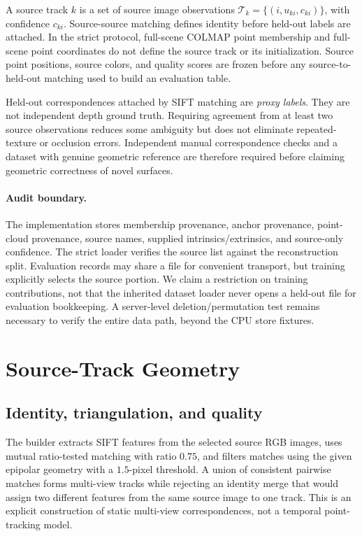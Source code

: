 \documentclass[10pt,twocolumn,letterpaper]{article}
\newcommand{\cT}{\mathcal{T}}
\begin{document}
A source track $k$ is a set of source image observations $\cT_k=\{(i,u_{ki},c_{ki})\}$, with confidence $c_{ki}$. Source-source matching defines identity before held-out labels are attached. In the strict protocol, full-scene COLMAP point membership and full-scene point coordinates do not define the source track or its initialization. Source point positions, source colors, and quality scores are frozen before any source-to-held-out matching used to build an evaluation table.

Held-out correspondences attached by SIFT matching are \emph{proxy labels}. They are not independent depth ground truth. Requiring agreement from at least two source observations reduces some ambiguity but does not eliminate repeated-texture or occlusion errors. Independent manual correspondence checks and a dataset with genuine geometric reference are therefore required before claiming geometric correctness of novel surfaces.

\paragraph{Audit boundary.} The implementation stores membership provenance, anchor provenance, point-cloud provenance, source names, supplied intrinsics/extrinsics, and source-only confidence. The strict loader verifies the source list against the reconstruction split. Evaluation records may share a file for convenient transport, but training explicitly selects the source portion. We claim a restriction on training contributions, not that the inherited dataset loader never opens a held-out file for evaluation bookkeeping. A server-level deletion/permutation test remains necessary to verify the entire data path, beyond the CPU store fixtures.

\section{Source-Track Geometry}
\subsection{Identity, triangulation, and quality}
The builder extracts SIFT features from the selected source RGB images, uses mutual ratio-tested matching with ratio $0.75$, and filters matches using the given epipolar geometry with a $1.5$-pixel threshold. A union of consistent pairwise matches forms multi-view tracks while rejecting an identity merge that would assign two different features from the same source image to one track. This is an explicit construction of static multi-view correspondences, not a temporal point-tracking model.
\end{document}
